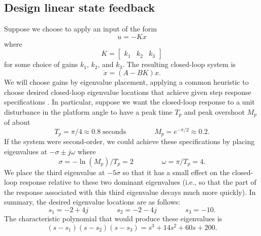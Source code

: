 \documentclass[conf]{new-aiaa}
\begin{document}
\subsection{Design linear state feedback}
\label{sec-design}

Suppose we choose to apply an input of the form
\begin{equation}
u = - Kx
\end{equation}
where
\begin{equation}
K = \begin{bmatrix} k_{1} & k_{2} & k_{3} \end{bmatrix}
\end{equation}
for some choice of gains $k_{1}$, $k_{2}$, and $k_{3}$. The resulting closed-loop system is
\begin{equation}
\dot{x} = (A - BK) x.
\label{eq-closedloop}
\end{equation}
We will choose gains by eigenvalue placement, applying a common heuristic to choose desired closed-loop eigenvalue locations that achieve given step response specifications \cite{Astrom2021}.
In particular, suppose we want the closed-loop response to a unit disturbance in the platform angle to have a peak time $T_{p}$ and peak overshoot $M_{p}$ of about
\begin{equation}
T_{p} = \pi / 4 \approx 0.8\;\text{seconds}
\qquad\qquad
M_{p} = e^{-\pi / 2} \approx 0.2.
\label{eq-peaktargets}
\end{equation}
If the system were second-order, we could achieve these specifications by placing eigenvalues at $-\sigma \pm j\omega$ where
\begin{equation}
\sigma = -\ln(M_{p}) / T_{p} = 2
\qquad\qquad
\omega = \pi / T_{p} = 4.
\label{eq-heuristic}
\end{equation}
We place the third eigenvalue at $-5\sigma$ so that it has a small effect on the closed-loop response relative to these two dominant eigenvalues (i.e., so that the part of the response associated with this third eigenvalue decays much more quickly). In summary, the desired eigenvalue locations are as follows:
\begin{equation}
s_{1} = -2+4j
\qquad\qquad
s_{2} = -2-4j
\qquad\qquad
s_{3} = -10.
\label{eq-eigs}
\end{equation}
The characteristic polynomial that would produce these eigenvalues is
\begin{equation}
(s - s_{1}) (s - s_{2})(s - s_{3}) = s^{3} + 14 s^{2} + 60 s + 200.
\label{eq-charpoly-want}
\end{equation}
\end{document}
